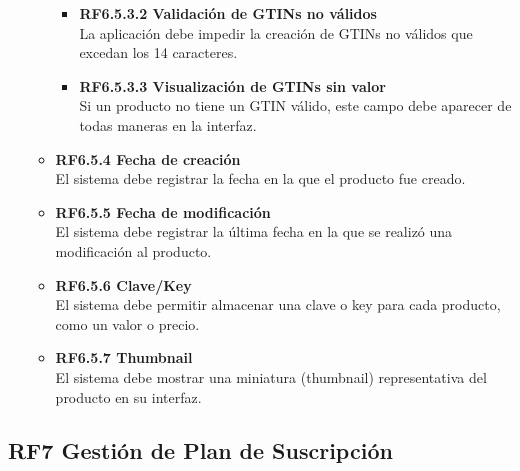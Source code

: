 \documentclass[12pt.a4paper]{article}
\begin{document}
\begin{itemize}
\begin{itemize}
\begin{itemize}
            \item \textbf{RF6.5.3.2 Validación de GTINs no válidos} \\
            La aplicación debe impedir la creación de GTINs no válidos que excedan los 14 caracteres.

            \item \textbf{RF6.5.3.3 Visualización de GTINs sin valor} \\
            Si un producto no tiene un GTIN válido, este campo debe aparecer de todas maneras en la interfaz.
        \end{itemize}

        \item \textbf{RF6.5.4 Fecha de creación} \\
        El sistema debe registrar la fecha en la que el producto fue creado.

        \item \textbf{RF6.5.5 Fecha de modificación} \\
        El sistema debe registrar la última fecha en la que se realizó una modificación al producto.

        \item \textbf{RF6.5.6 Clave/Key} \\
        El sistema debe permitir almacenar una clave o key para cada producto, como un valor o precio.

        \item \textbf{RF6.5.7 Thumbnail} \\
        El sistema debe mostrar una miniatura (thumbnail) representativa del producto en su interfaz.
    \end{itemize}

\end{itemize}

\subsection*{RF7 Gestión de Plan de Suscripción}
\end{document}
